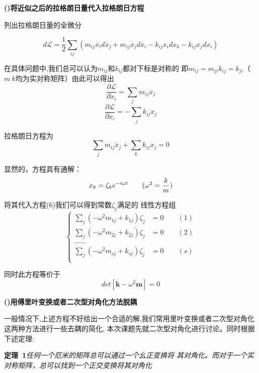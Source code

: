 \documentclass[11pt, a4paper, oneside]{ctexart}
\begin{document}
{\textbf{()将近似之后的拉格朗日量代入拉格朗日方程}

列出拉格朗日量的全微分

\begin{equation}
    d\mathscr{L} = \frac{1}{2} \sum_{ij} (m_{ij} \dot {x_i} d \dot {x_j} +
    m_{ij} \dot {x_j} d \dot {x_i} -k_{ij}x_idx_k-k_{ij}x_jdx_i)
\end{equation}

在具体问题中,我们总可以认为$m_{ij}$和$k_{ij}$都对下标是对称的
即$m_{ij}=m_{ji}k_{ij}=k_{ji}$（$m\ k$均为实对称矩阵）由此可以得出
$$\frac{\partial\mathscr{L}}{\partial\dot x_i}
= \sum _j m_{ij} \dot x_j
$$$$
\frac{\partial\mathscr{L}}{\partial x_i}
= -\sum _j k_{ij} x_j
$$


拉格朗日方程为
\begin{equation}
    \sum_jm_{ij}\ddot x_j + \sum_k k_{ij} x_j = 0
\end{equation}

显然的，方程具有通解：
\begin{equation}
    x_k=\zeta_ke^{-i\omega t}
\\
\qquad(\omega^2 = \frac{k}{m})
\end{equation}


将其代入方程(6)我们可以得到常数$\zeta_j$满足的
线性方程组
\begin{equation}
    \left\{
    \begin{aligned}
    \sum_j(-\omega^2m_{1j}+k_{1j})\zeta _j&=0\qquad(1)\\
    \sum_j(-\omega^2m_{2j}+k_{2j})\zeta_j&=0\qquad(2)\\
    \dots\dots\\
    \sum_j(-\omega^2m_{sj}+k_{sj})\zeta_j&=0\qquad(s)\\
    \end{aligned}
    \right.
\end{equation}


同时此方程等价于
\begin{equation}
    det[\bm{k}-\omega^2\bm{m}]=0
\end{equation}

\textbf{()用傅里叶变换或者二次型对角化方法脱耦}


一般情况下,上述方程不好给出一个合适的解,我们常用里叶变换或者二次型对角化这两种方法进行一些去耦的简化,
本次课题先就二次型对角化进行讨论。同时根据下述定理:

\textbf{定理\ 1}\emph{{任何一个厄米的矩阵总可以通过一个幺正变换将
其对角化。而对于一个实对称矩阵，总可以找到一个正交变换将其对角化}}

}
\end{document}
